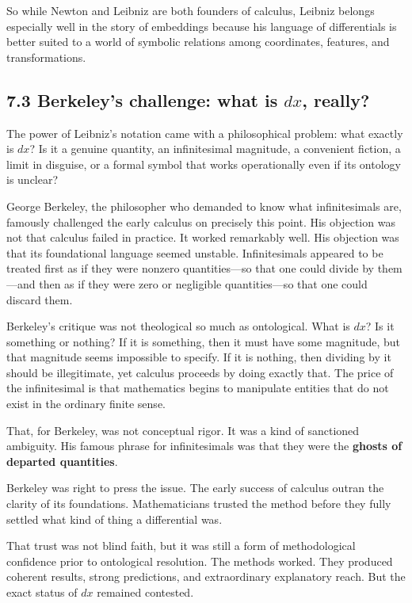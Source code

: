 So while Newton and Leibniz are both founders of calculus, Leibniz
belongs especially well in the story of embeddings because his language
of differentials is better suited to a world of symbolic relations among
coordinates, features, and transformations.

\hypertarget{berkeleys-challenge-what-is-dx-really}{%
\subsection{\texorpdfstring{7.3 Berkeley's challenge: what is \(dx\),
really?}{7.3 Berkeley's challenge: what is dx, really?}}\label{berkeleys-challenge-what-is-dx-really}}

The power of Leibniz's notation came with a philosophical problem: what
exactly is \(dx\)? Is it a genuine quantity, an infinitesimal magnitude,
a convenient fiction, a limit in disguise, or a formal symbol that works
operationally even if its ontology is unclear?

George Berkeley, the philosopher who demanded to know what
infinitesimals are, famously challenged the early calculus on precisely
this point. His objection was not that calculus failed in practice. It
worked remarkably well. His objection was that its foundational language
seemed unstable. Infinitesimals appeared to be treated first as if they
were nonzero quantities---so that one could divide by them---and then as
if they were zero or negligible quantities---so that one could discard
them.

Berkeley's critique was not theological so much as ontological. What is
\(dx\)? Is it something or nothing? If it is something, then it must
have some magnitude, but that magnitude seems impossible to specify. If
it is nothing, then dividing by it should be illegitimate, yet calculus
proceeds by doing exactly that. The price of the infinitesimal is that
mathematics begins to manipulate entities that do not exist in the
ordinary finite sense.

That, for Berkeley, was not conceptual rigor. It was a kind of
sanctioned ambiguity. His famous phrase for infinitesimals was that they
were the \textbf{ghosts of departed quantities}.

Berkeley was right to press the issue. The early success of calculus
outran the clarity of its foundations. Mathematicians trusted the method
before they fully settled what kind of thing a differential was.

That trust was not blind faith, but it was still a form of
methodological confidence prior to ontological resolution. The methods
worked. They produced coherent results, strong predictions, and
extraordinary explanatory reach. But the exact status of \(dx\) remained
contested.

